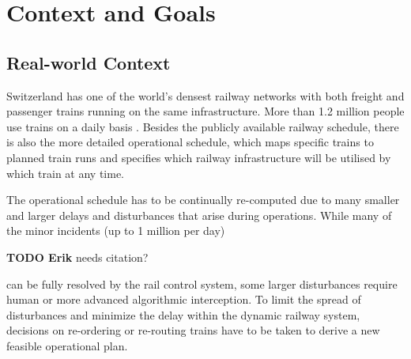 \documentclass{article}
\begin{document}
\section{Context and Goals}

\subsection{Real-world Context}
Switzerland has one of the world's densest railway networks with both freight and passenger trains running on the same infrastructure. More than 1.2 million people use trains on a daily basis \cite{rcsbrochure}.
Besides the publicly available railway schedule, there is also the more detailed operational schedule, which maps specific trains to planned train runs and specifies which railway infrastructure will be utilised by which train at any time.

The operational schedule has to be continually re-computed due to many smaller and larger delays and disturbances that arise during operations. While many of the minor incidents (up to 1 million per day)
\begin{mdframed}
{\bf TODO Erik} needs citation?
\end{mdframed}
can be fully resolved by the rail control system, some larger disturbances require human or more advanced algorithmic interception. To limit the spread of disturbances and minimize the delay within the dynamic railway system, decisions on re-ordering or re-routing trains have to be taken to derive a new feasible operational plan.
\end{document}
